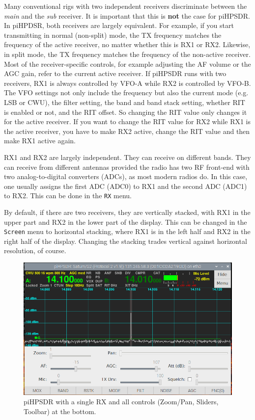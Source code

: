 \documentclass[12pt]{book}
\def\bltt#1{\texttt{\color{blue}#1}}
\def\pH{pi\-HPSDR\xspace}
\begin{document}
 Many conventional rigs with two independent receivers discriminate
 between the \textit{main} and the \textit{sub} receiver. It is important that
 this is \textbf{not} the case for \pH. In piHPDSR, both  receivers are
 largely equivalent. For example, if you start transmitting in
 normal (non-split) mode, the TX frequency matches the frequency
 of the active receiver, no matter whether this is RX1 or RX2.
 Likewise, in split mode, the TX frequency matches the frequency
 of the non-active receiver. Most of the receiver-specific controls,
 for example adjusting the AF volume or the AGC gain, refer to the
 current active receiver. If \pH runs with two receivers,
 RX1 is always controlled by VFO-A while RX2 is controlled by VFO-B.
 The VFO settings not only include the frequency but also the
 current mode (e.g. LSB or CWU), the filter setting, the band and
 band stack setting, whether RIT is enabled or not, and the RIT
 offset. So changing the RIT value only changes it for the active
 receiver. If you want  to change the RIT value for RX2 while RX1 is
 the active receiver, you have to make RX2 active, change the RIT
 value and then make RX1 active again.

 RX1 and RX2 are largely independent. They can receive on different
 bands. They can receive from different antennas provided the radio
 has two RF front-end with two analog-to-digital converters (ADCs),
 as most modern radios do. In this case, one usually
 assigns the first ADC (ADC0) to RX1 and the second ADC (ADC1) to
 RX2. This can be done in the \bltt{RX} menu.

 By default, if there are two receivers, they are vertically stacked,
 with RX1 in the upper part and RX2 in the lower part of the display.
 This can be changed in the \bltt{Screen} menu to horizontal stacking,
 where RX1 is  in the left half and RX2 in the right half of  the
 display. Changing the stacking trades vertical against horizontal
 resolution, of course.


\begin{figure}[ht]
\center
\includegraphics[width=12cm]{SingleReceiver.png}
\caption{\pH with a single RX and all controls (Zoom/Pan,
Sliders, Toolbar) at the  bottom.}
\label{fig:SingleReceiver}
\end{figure}
\end{document}
